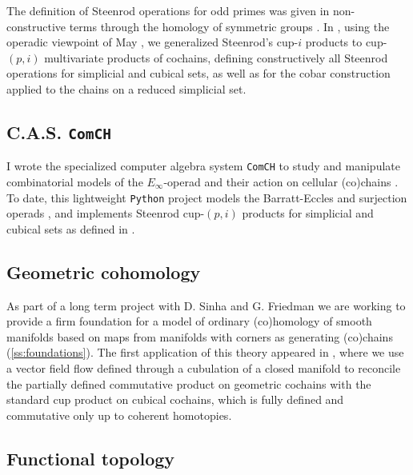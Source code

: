 The definition of Steenrod operations for odd primes was given in non-constructive terms through the homology of symmetric groups \cite{steenrod1952reduced, steenrod1962cohomology}.
In \cite{medina2020maysteenrod}, using the operadic viewpoint of May \cite{may1970general}, we generalized Steenrod's cup-$i$ products to cup-$(p,i)$ multivariate products of cochains, defining constructively all Steenrod operations for simplicial and cubical sets, as well as for the cobar construction applied to the chains on a reduced simplicial set.

\subsection{C.A.S. \texttt{ComCH}}

I wrote the specialized computer algebra system \texttt{ComCH} to study and manipulate combinatorial models of the $E_\infty$-operad and their action on cellular (co)chains \cite{medina2021computer}.
To date, this lightweight \texttt{Python} project models the Barratt-Eccles and surjection operads \cite{mcclure2003multivariable,berger2004combinatorial}, and implements Steenrod cup-$(p,i)$ products for simplicial and cubical sets as defined in \cite{medina2020maysteenrod}.

\subsection{Geometric cohomology} \label{ss:flows}

As part of a long term project with D. Sinha and G. Friedman we are working to provide a firm foundation for a model of ordinary (co)homology of smooth manifolds based on maps from manifolds with corners as generating (co)chains (\cref{ss:foundations}).
The first application of this theory appeared in \cite{medina2021flowing}, where we use a vector field flow defined through a cubulation of a closed manifold to reconcile the partially defined commutative product on geometric cochains with the standard cup product on cubical cochains, which is fully defined and commutative only up to coherent homotopies.

\subsection{Functional topology}

